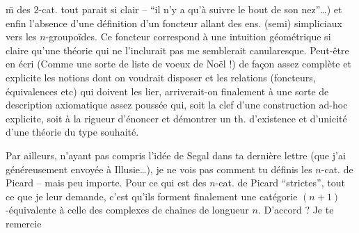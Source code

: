 \={m} des $2$-cat. tout parait si clair -- ``il n'y a qu'à suivre le bout de son nez''\dots) et enfin l'absence d'une définition d'un foncteur allant des ens. (semi) simpliciaux vers les $n$-groupoïdes. Ce foncteur correspond à une intuition géométrique si claire qu'une théorie qui ne l'inclurait pas me semblerait canularesque. Peut-être en écri (Comme une sorte de liste de voeux de Noël !) de façon assez complète et explicite les  notions dont on voudrait disposer et les relations (foncteurs, équivalences etc) qui doivent les lier, arriverait-on finalement à une sorte de description axiomatique assez poussée qui, soit  la clef d'une construction ad-hoc explicite, soit  à la rigueur d'énoncer et démontrer un th. d'existence et d'unicité d'une théorie du type souhaité.

Par ailleurs, n'ayant pas compris l'idée de Segal dans ta dernière lettre (que j'ai généreusement envoyée à Illusie\dots), je ne vois pas comment tu définis les $n$-cat. de Picard -- mais peu importe. Pour ce qui est des $n$-cat. de Picard ``strictes'', tout ce que je leur demande, c'est qu'ils forment finalement une catégorie $(n+1)$-équivalente à celle des complexes de chaines de longueur\unsure{,} $n$. D'accord ? Je te remercie
